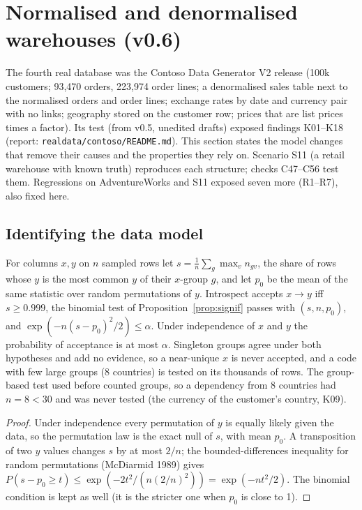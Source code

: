 \section{Normalised and denormalised warehouses (v0.6)}\label{sec:v06}
The fourth real database was the Contoso Data Generator V2 release (100k customers; 93{,}470 orders, 223{,}974 order lines; a denormalised sales table next to the normalised orders and order lines; exchange rates by date and currency pair with no links; geography stored on the customer row; prices that are list prices times a factor). Its test (from v0.5, unedited drafts) exposed findings K01--K18 (report: \texttt{realdata/contoso/README.md}). This section states the model changes that remove their causes and the properties they rely on. Scenario S11 (a retail warehouse with known truth) reproduces each structure; checks C47--C56 test them. Regressions on AdventureWorks and S11 exposed seven more (R1--R7), also fixed here.

\subsection{Identifying the data model}
\begin{proposition}\label{prop:fdrows}
For columns $x,y$ on $n$ sampled rows let $s=\frac1n\sum_g\max_v n_{gv}$, the share of rows whose $y$ is the most common $y$ of their $x$-group $g$, and let $p_0$ be the mean of the same statistic over random permutations of $y$. Introspect accepts $x\to y$ iff $s\ge0.999$, the binomial test of Proposition~\ref{prop:signif} passes with $(s,n,p_0)$, and $\exp(-n(s-p_0)^2/2)\le\alpha$. Under independence of $x$ and $y$ the probability of acceptance is at most $\alpha$. Singleton groups agree under both hypotheses and add no evidence, so a near-unique $x$ is never accepted, and a code with few large groups (8 countries) is tested on its thousands of rows. The group-based test used before counted groups, so a dependency from 8 countries had $n=8<30$ and was never tested (the currency of the customer's country, K09).
\end{proposition}
\begin{proof}
Under independence every permutation of $y$ is equally likely given the data, so the permutation law is the exact null of $s$, with mean $p_0$. A transposition of two $y$ values changes $s$ by at most $2/n$; the bounded-differences inequality for random permutations (McDiarmid 1989) gives $P(s-p_0\ge t)\le\exp(-2t^2/(n(2/n)^2))=\exp(-nt^2/2)$. The binomial condition is kept as well (it is the stricter one when $p_0$ is close to 1).
\end{proof}

